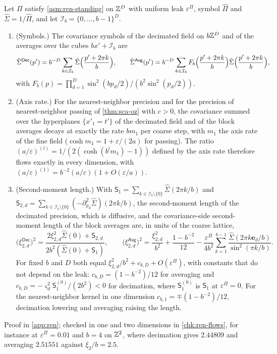 \begin{theorem}\label{thm:ren-flows}
Let $\Pi$ satisfy \cref{asm:ren-standing} on $\mathbb{Z}^D$ with uniform leak $\varepsilon^\Pi$, symbol $\hat\Pi$ and $\hat\Sigma=1/\hat\Pi$, and let $\mathcal I_b=\{0,\dots,b-1\}^D$.
\begin{enumerate}
\item[(a)] (Symbols.) The covariance symbols of the decimated field on $b\mathbb{Z}^D$ and of the averages over the cubes $bx'+\mathcal I_b$ are
\begin{equation}\label{eq:ren-symbols}
\hat\Sigma^{\mathsf{Dec}}(p')=b^{-D}\sum_{k\in\mathcal I_b}\hat\Sigma\Bigl(\frac{p'+2\pi k}b\Bigr),\qquad\hat\Sigma^{\mathsf{Avg}}(p')=b^{-D}\sum_{k\in\mathcal I_b}F_b\Bigl(\frac{p'+2\pi k}b\Bigr)\hat\Sigma\Bigl(\frac{p'+2\pi k}b\Bigr),
\end{equation}
with $F_b(p)=\prod_{d=1}^D\sin^2(bp_d/2)/(b^2\sin^2(p_d/2))$.
\item[(b)] (Axis rate.) For the nearest-neighbor precision and for the precision of nearest-neighbor passing of \cref{thm:sca-oz} with $c>0$, the covariance summed over the hyperplanes $\{x'_1=t'\}$ of the decimated field and of the block averages decays at exactly the rate $bm_1$ per coarse step, with $m_1$ the axis rate of the fine field ($\cosh m_1=1+\varepsilon/(2a)$ for passing). The ratio $(a/\varepsilon)^{(l)}=1/(2(\cosh(b^lm_1)-1))$ defined by the axis rate therefore flows exactly in every dimension, with $(a/\varepsilon)^{(1)}=b^{-2}(a/\varepsilon)(1+O(\varepsilon/a))$.
\item[(c)] (Second-moment length.) With $\mathsf S_1=\sum_{k\in\mathcal I_b\setminus\{0\}}\hat\Sigma(2\pi k/b)$ and $\mathsf S_{2,d}=\sum_{k\in\mathcal I_b\setminus\{0\}}(-\partial^2_{p_d}\hat\Sigma)(2\pi k/b)$, the second-moment length of the decimated precision, which is diffusive, and the covariance-side second-moment length of the block averages are, in units of the coarse lattice,
\begin{equation}\label{eq:ren-xi2-flow}
\bigl(\xi^{\mathsf{Dec}}_{2,d}\bigr)^2=\frac{2\xi_{2,d}^2\hat\Sigma(0)+\mathsf S_{2,d}}{2b^2(\hat\Sigma(0)+\mathsf S_1)},\qquad\bigl(\xi^{\mathsf{Avg}}_{2,d}\bigr)^2=\frac{\xi_{2,d}^2}{b^2}+\frac{1-b^{-2}}{12}-\frac{\varepsilon^\Pi}{4b^2}\sum_{k=1}^{b-1}\frac{\hat\Sigma(2\pi k\mathbf e_d/b)}{\sin^2(\pi k/b)}.
\end{equation}
For fixed $b$ and $D$ both equal $\xi_{2,d}^2/b^2+c_{b,D}+O(\varepsilon^\Pi)$, with constants that do not depend on the leak: $c_{b,D}=(1-b^{-2})/12$ for averaging and $c_{b,D}=-\varsigma_d^2\mathsf S^{(0)}_1/(2b^2)<0$ for decimation, where $\mathsf S^{(0)}_1$ is $\mathsf S_1$ at $\varepsilon^\Pi=0$. For the nearest-neighbor kernel in one dimension $c_{b,1}=\mp(1-b^{-2})/12$, decimation lowering and averaging raising the length.
\end{enumerate}
\end{theorem}
Proof in \cref{app:ren}; checked in one and two dimensions in \cref{chk:ren-flows}, for instance at $\varepsilon^\Pi=0.01$ and $b=4$ on $\mathbb{Z}^2$, where decimation gives $2.44809$ and averaging $2.51551$ against $\xi_2/b=2.5$.

